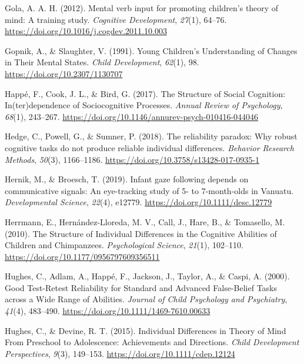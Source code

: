 \documentclass[
  man,floatsintext]{apa6}
\newlength{\cslhangindent}
\newlength{\cslentryspacingunit} %
\newenvironment{CSLReferences}[2] %
 {%
  \setlength{\parindent}{0pt}
  \ifodd #1
  \let\oldpar\par
  \def\par{\hangindent=\cslhangindent\oldpar}
  \fi
  \setlength{\parskip}{#2\cslentryspacingunit}
 }%
 {}
\begin{document}
\begin{CSLReferences}{1}{0}
\leavevmode{}%
Gola, A. A. H. (2012). Mental verb input for promoting children's theory of mind: {A} training study. \emph{Cognitive Development}, \emph{27}(1), 64--76. \url{https://doi.org/10.1016/j.cogdev.2011.10.003}

\leavevmode{}%
Gopnik, A., \& Slaughter, V. (1991). Young {Children}'s {Understanding} of {Changes} in {Their Mental States}. \emph{Child Development}, \emph{62}(1), 98. \url{https://doi.org/10.2307/1130707}

\leavevmode{}%
Happé, F., Cook, J. L., \& Bird, G. (2017). The {Structure} of {Social Cognition}: {In}(ter)dependence of {Sociocognitive Processes}. \emph{Annual Review of Psychology}, \emph{68}(1), 243--267. \url{https://doi.org/10.1146/annurev-psych-010416-044046}

\leavevmode{}%
Hedge, C., Powell, G., \& Sumner, P. (2018). The reliability paradox: {Why} robust cognitive tasks do not produce reliable individual differences. \emph{Behavior Research Methods}, \emph{50}(3), 1166--1186. \url{https://doi.org/10.3758/s13428-017-0935-1}

\leavevmode{}%
Hernik, M., \& Broesch, T. (2019). Infant gaze following depends on communicative signals: {An} eye-tracking study of 5- to 7-month-olds in {Vanuatu}. \emph{Developmental Science}, \emph{22}(4), e12779. \url{https://doi.org/10.1111/desc.12779}

\leavevmode{}%
Herrmann, E., Hernández-Lloreda, M. V., Call, J., Hare, B., \& Tomasello, M. (2010). The {Structure} of {Individual Differences} in the {Cognitive Abilities} of {Children} and {Chimpanzees}. \emph{Psychological Science}, \emph{21}(1), 102--110. \url{https://doi.org/10.1177/0956797609356511}

\leavevmode{}%
Hughes, C., Adlam, A., Happé, F., Jackson, J., Taylor, A., \& Caspi, A. (2000). Good {Test}-{Retest Reliability} for {Standard} and {Advanced False}-{Belief Tasks} across a {Wide Range} of {Abilities}. \emph{Journal of Child Psychology and Psychiatry}, \emph{41}(4), 483--490. \url{https://doi.org/10.1111/1469-7610.00633}

\leavevmode{}%
Hughes, C., \& Devine, R. T. (2015). Individual {Differences} in {Theory} of {Mind From Preschool} to {Adolescence}: {Achievements} and {Directions}. \emph{Child Development Perspectives}, \emph{9}(3), 149--153. \url{https://doi.org/10.1111/cdep.12124}


\end{CSLReferences}
\end{document}
